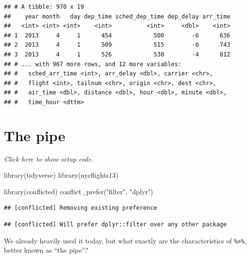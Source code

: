 \documentclass[]{book}
\newenvironment{Shaded}{}{}
\newcommand{\DecValTok}[1]{#1}
\newcommand{\KeywordTok}[1]{\textcolor[rgb]{0.00,0.00,1.00}{#1}}
\newcommand{\NormalTok}[1]{#1}
\newcommand{\OperatorTok}[1]{#1}
\newcommand{\StringTok}[1]{\textcolor[rgb]{0.00,0.50,0.50}{#1}}
\begin{document}
\begin{verbatim}
## # A tibble: 970 x 19
##    year month   day dep_time sched_dep_time dep_delay arr_time
##   <int> <int> <int>    <int>          <int>     <dbl>    <int>
## 1  2013     4     1      454            500        -6      636
## 2  2013     4     1      509            515        -6      743
## 3  2013     4     1      526            530        -4      812
## # ... with 967 more rows, and 12 more variables:
## #   sched_arr_time <int>, arr_delay <dbl>, carrier <chr>,
## #   flight <int>, tailnum <chr>, origin <chr>, dest <chr>,
## #   air_time <dbl>, distance <dbl>, hour <dbl>, minute <dbl>,
## #   time_hour <dttm>
\end{verbatim}

\hypertarget{the-pipe}{%
\section{The pipe}\label{the-pipe}}

\emph{Click here to show setup code.}

\begin{Shaded}
\begin{Highlighting}[]
\KeywordTok{library}\NormalTok{(tidyverse)}
\KeywordTok{library}\NormalTok{(nycflights13)}

\KeywordTok{library}\NormalTok{(conflicted)}
\KeywordTok{conflict_prefer}\NormalTok{(}\StringTok{"filter"}\NormalTok{, }\StringTok{"dplyr"}\NormalTok{)}
\end{Highlighting}
\end{Shaded}

\begin{verbatim}
## [conflicted] Removing existing preference
\end{verbatim}

\begin{verbatim}
## [conflicted] Will prefer dplyr::filter over any other package
\end{verbatim}

We already heavily used it today, but what exactly are the characteristics of \texttt{\%\textgreater{}\%}, better known as ``the pipe''?

\begin{Shaded}
\end{Shaded}
\end{document}
